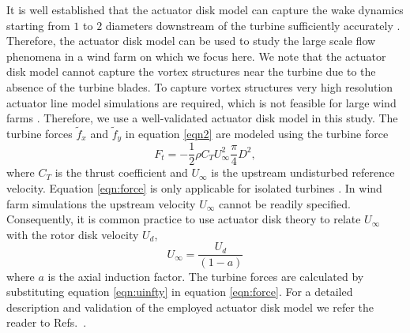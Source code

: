 \documentclass[%
 aip,
 amsmath,amssymb,
reprint,
twocolumn,%
author-numerical,%
]{revtex4-1}
\begin{document}
It is well established that the actuator disk model can capture the wake dynamics starting from $1$ to $2$ diameters downstream of the turbine sufficiently accurately \cite{ste17, ste18, wu11}. Therefore, the actuator disk model can be used to study the large scale flow phenomena in a wind farm on which we focus here. We note that the actuator disk model cannot capture the vortex structures near the turbine due to the absence of the turbine blades\cite{sor11, tro10, ste17}. To capture vortex structures very high resolution actuator line model simulations are required, which is not feasible for large wind farms \cite{ste18}. Therefore, we use a well-validated actuator disk model \cite{jim07, jim08,cal10, ste14, ste16, zha19,nag19} in this study. The turbine forces $\widetilde{f}_x$ and $\widetilde{f}_y$ in equation \eqref{eqn2} are modeled using the turbine force
%
\begin{equation}
 F_t = -\frac{1}{2}\rho{C_T}{U^2_\infty}\frac{\pi}{4}D^2,\label{eqn:force}
\end{equation} 
%
where $C_T$ is the thrust coefficient and $U_\infty$ is the upstream undisturbed reference velocity. Equation \eqref{eqn:force} is only applicable for isolated turbines \cite{jim07, jim08}. In wind farm simulations the upstream velocity $U_\infty$ cannot be readily specified. Consequently, it is common practice \cite{cal10, cal11} to use actuator disk theory to relate $U_\infty$ with the rotor disk velocity $U_d$,
\begin{equation}
U_\infty= \frac{U_d}{\left(1-a\right)}\label{eqn:uinfty}
\end{equation} 
%
where $a$ is the axial induction factor. The turbine forces are calculated by substituting equation \eqref{eqn:uinfty} in equation \eqref{eqn:force}. For a detailed description and validation of the employed actuator disk model we refer the reader to Refs.\ \cite{cal10, cal11,ste18}.
\end{document}
